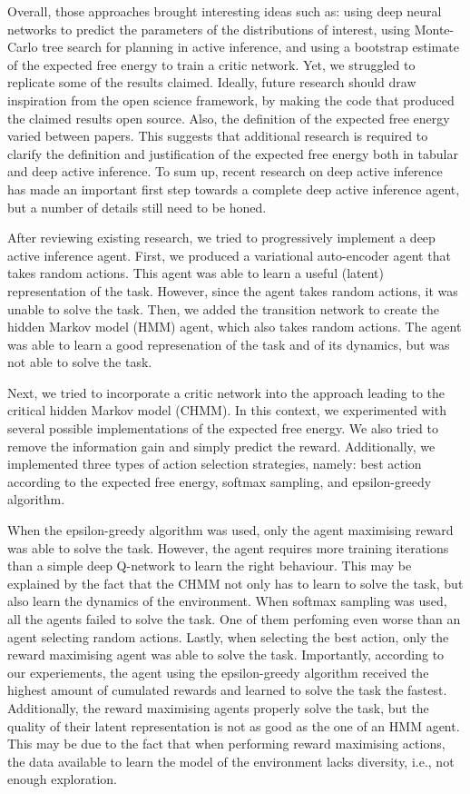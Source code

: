 \documentclass[twoside,11pt]{article}
\begin{document}
Overall, those approaches brought interesting ideas such as: using deep neural networks to predict the parameters of the distributions of interest, using Monte-Carlo tree search for planning in active inference, and using a bootstrap estimate of the expected free energy to train a critic network. Yet, we struggled to replicate some of the results claimed. Ideally, future research should draw inspiration from the open science framework, by making the code that produced the claimed results open source. Also, the definition of the expected free energy varied between papers. This suggests that additional research is required to clarify the definition and justification of the expected free energy both in tabular and deep active inference. To sum up, recent research on deep active inference \citep{DeepAIwithMCMC,DeepAI,rood2020deep,sancaktar2020endtoend,DAI_Kai,DAI_POMDP,ccatal2020learning} has made an important first step towards a complete deep active inference agent, but a number of details still need to be honed.

After reviewing existing research, we tried to progressively implement a deep active inference agent. First, we produced a variational auto-encoder agent that takes random actions. This agent was able to learn a useful (latent) representation of the task. However, since the agent takes random actions, it was unable to solve the task. Then, we added the transition network to create the hidden Markov model (HMM) agent, which also takes random actions. The agent was able to learn a good represenation of the task and of its dynamics, but was not able to solve the task.

Next, we tried to incorporate a critic network into the approach leading to the critical hidden Markov model (CHMM). In this context, we experimented with several possible implementations of the expected free energy. We also tried to remove the information gain and simply predict the reward. Additionally, we implemented three types of action selection strategies, namely: best action according to the expected free energy, softmax sampling, and epsilon-greedy algorithm.

When the epsilon-greedy algorithm was used, only the agent maximising reward was able to solve the task.
However, the agent requires more training iterations than a simple deep Q-network to learn the right behaviour.
This may be explained by the fact that the CHMM not only has to learn to solve the task, but also learn the dynamics of the environment.
When softmax sampling was used, all the agents failed to solve the task. One of them perfoming even worse than an agent selecting random actions.
Lastly, when selecting the best action, only the reward maximising agent was able to solve the task.
Importantly, according to our experiements, the agent using the epsilon-greedy algorithm received the highest amount of cumulated rewards and learned to solve the task the fastest.
Additionally, the reward maximising agents properly solve the task, but the quality of their latent representation is not as good as the one of an HMM agent.
This may be due to the fact that when performing reward maximising actions, the data available to learn the model of the environment lacks diversity, i.e., not enough exploration.
\end{document}
